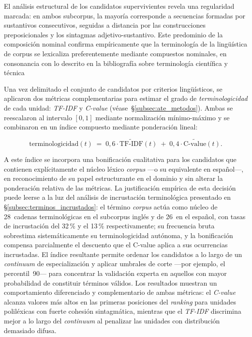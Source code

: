 El análisis estructural de los candidatos supervivientes revela una
regularidad marcada: en ambos subcorpus, la mayoría corresponde a
secuencias formadas por sustantivos consecutivos, seguidas a distancia
por las construcciones preposicionales y los sintagmas adjetivo-sustantivo.
Este predominio de la composición nominal confirma empíricamente que la
terminología de la lingüística de corpus se lexicaliza preferentemente
mediante compuestos nominales, en consonancia con lo descrito en la
bibliografía sobre terminología científica y técnica
\autocite{cabre1999terminology, sager1990terminology}

Una vez delimitado el conjunto de candidatos por criterios lingüísticos, se
aplicaron dos métricas complementarias para estimar el grado de
\emph{terminologicidad} de cada unidad: \textit{TF-IDF} y \textit{C-value}
(véase~§\ref{subsec:ate_metodos}). Ambas se reescalaron al intervalo $[0,1]$
mediante normalización mínimo-máximo y se combinaron en un índice
compuesto mediante ponderación lineal:

\begin{equation}
    \text{terminologicidad}(t) \;=\; 0{,}6 \cdot \widetilde{\text{TF-IDF}}(t)
                                \;+\; 0{,}4 \cdot \widetilde{\text{C-value}}(t).
    \label{eq:terminologicidad}
\end{equation}

A este índice se incorpora una bonificación cualitativa para los candidatos
que contienen explícitamente el núcleo léxico \textit{corpus} ---o su
equivalente en español---, en reconocimiento de su papel estructurante en
el dominio y sin alterar la ponderación relativa de las métricas. La
justificación empírica de esta decisión puede leerse a la luz del análisis de
incrustación terminológica presentado en §\ref{subsec:terminos_incrustados}: el
término \textit{corpus} actúa como núcleo de 28~cadenas terminológicas en el
subcorpus inglés y de 26~en el español, con tasas de incrustación del 32\,\%
y el 13\,\% respectivamente; su frecuencia bruta sobrestima sistemáticamente su
terminologicidad autónoma, y la bonificación compensa parcialmente el descuento
que el C-value aplica a sus ocurrencias incrustadas. El
índice resultante permite ordenar los candidatos a lo largo de un
\textit{continuum} de especialización y aplicar umbrales de corte
---por ejemplo, el percentil~90--- para concentrar la validación experta
en aquellos con mayor probabilidad de constituir términos válidos. Los
resultados muestran un comportamiento diferenciado y complementario de
ambas métricas: el \textit{C-value} alcanza valores más altos en las
primeras posiciones del \textit{ranking} para unidades poliléxicas con
fuerte cohesión sintagmática, mientras que el \textit{TF-IDF} discrimina
mejor a lo largo del \textit{continuum} al penalizar las unidades con
distribución demasiado difusa.

